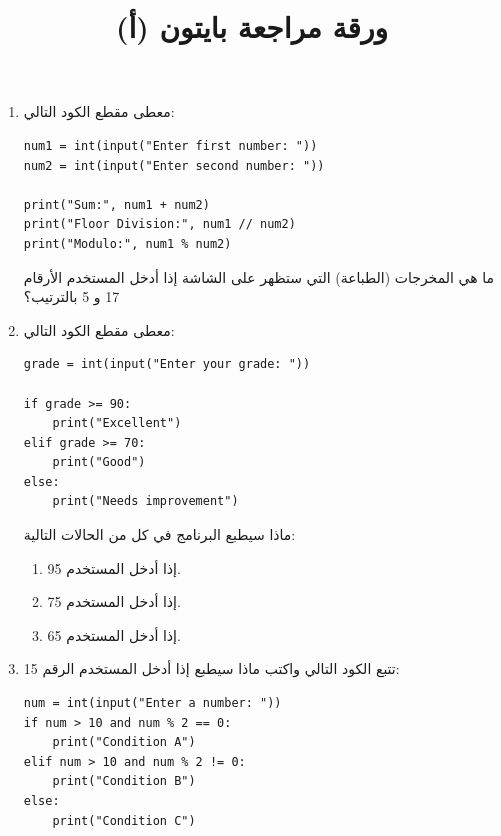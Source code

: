 \documentclass[14pt]{extarticle}
\title{ورقة مراجعة بايتون (أ)}
\date{}
\begin{document}
\maketitle
\thispagestyle{fancy}

\begin{enumerate}[itemsep=2em]
    \item
    معطى مقطع الكود التالي:
    \begin{boxCode}
    \begin{english}
    \begin{verbatim}
num1 = int(input("Enter first number: "))
num2 = int(input("Enter second number: "))

print("Sum:", num1 + num2)
print("Floor Division:", num1 // num2)
print("Modulo:", num1 % num2)
    \end{verbatim}
    \end{english}
    \end{boxCode}
    ما هي المخرجات (الطباعة) التي ستظهر على الشاشة إذا أدخل المستخدم الأرقام 17 و 5 بالترتيب؟

    \item
    معطى مقطع الكود التالي:
    \begin{boxCode}
    \begin{english}
    \begin{verbatim}
grade = int(input("Enter your grade: "))

if grade >= 90:
    print("Excellent")
elif grade >= 70:
    print("Good")
else:
    print("Needs improvement")
    \end{verbatim}
    \end{english}
    \end{boxCode}
    ماذا سيطبع البرنامج في كل من الحالات التالية:
    \begin{enumerate}[label=(\alph*)]
        \item إذا أدخل المستخدم 95.
        \item إذا أدخل المستخدم 75.
        \item إذا أدخل المستخدم 65.
    \end{enumerate}

    \item
    تتبع الكود التالي واكتب ماذا سيطبع إذا أدخل المستخدم الرقم 15:
    \begin{boxCode}
    \begin{english}
    \begin{verbatim}
num = int(input("Enter a number: "))
if num > 10 and num % 2 == 0:
    print("Condition A")
elif num > 10 and num % 2 != 0:
    print("Condition B")
else:
    print("Condition C")
    \end{verbatim}
    \end{english}
    \end{boxCode}


\end{enumerate}
\end{document}
